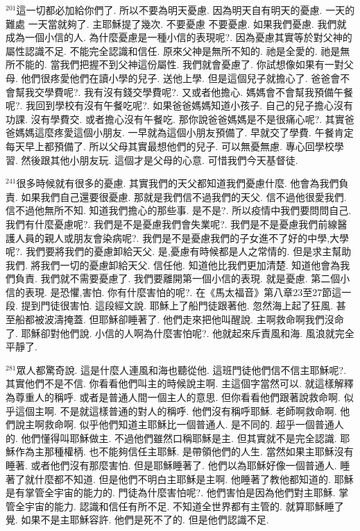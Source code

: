 \documentclass{book}
\begin{document}
$^{201}$這一切都必加給你們了.
所以不要為明天憂慮.
因為明天自有明天的憂慮.
一天的難處 一天當就夠了.
主耶穌提了幾次.
不要憂慮 不要憂慮.
如果我們憂慮.
我們就成為一個小信的人.
為什麼憂慮是一種小信的表現呢?.
因為憂慮其實等於對父神的屬性認識不足.
不能完全認識和信任.
原來父神是無所不知的.
祂是全愛的.
祂是無所不能的.
當我們把握不到父神這份屬性.
我們就會憂慮了.
你試想像如果有一對父母.
他們很疼愛他們在讀小學的兒子.
送他上學.
但是這個兒子就擔心了.
爸爸會不會幫我交學費呢?.
我有沒有錢交學費呢?.
又或者他擔心.
媽媽會不會幫我預備午餐呢?.
我回到學校有沒有午餐吃呢?.
如果爸爸媽媽知道小孩子.
自己的兒子擔心沒有功課.
沒有學費交.
或者擔心沒有午餐吃.
那你說爸爸媽媽是不是很痛心呢?.
其實爸爸媽媽這麼疼愛這個小朋友.
一早就為這個小朋友預備了.
早就交了學費.
午餐肯定每天早上都預備了.
所以父母其實最想他們的兒子.
可以無憂無慮.
專心回學校學習.
然後跟其他小朋友玩.
這個才是父母的心意.
可惜我們今天基督徒.

$^{241}$很多時候就有很多的憂慮.
其實我們的天父都知道我們憂慮什麼.
他會為我們負責.
如果我們自己還要很憂慮.
那就是我們信不過我們的天父.
信不過他很愛我們.
信不過他無所不知.
知道我們擔心的那些事.
是不是?.
所以疫情中我們要問問自己.
我們有什麼憂慮呢?.
我們是不是憂慮我們會失業呢?.
我們是不是憂慮我們前線醫護人員的親人或朋友會染病呢?.
我們是不是憂慮我們的子女進不了好的中學,大學呢?.
我們要將我們的憂慮卸給天父.
是,憂慮有時候都是人之常情的.
但是求主幫助我們.
將我們一切的憂慮卸給天父.
信任他.
知道他比我們更加清楚.
知道他會為我們負責.
我們就不需要憂慮了.
我們要離開第一個小信的表現.
就是憂慮.
第二個小信的表現.
是恐懼,害怕.
你有什麼害怕的呢?.
在《馬太福音》第八章23至27節這一段.
提到門徒很害怕.
這段經文說.
耶穌上了船門徒跟著他.
忽然海上起了狂風.
甚至船都被波濤掩蓋.
但耶穌卻睡著了.
他們走來把他叫醒說.
主啊救命啊我們沒命了.
耶穌卻對他們說.
小信的人啊為什麼害怕呢?.
他就起來斥責風和海.
風浪就完全平靜了.

$^{281}$眾人都驚奇說.
這是什麼人連風和海也聽從他.
這班門徒他們信不信主耶穌呢?.
其實他們不是不信.
你看看他們叫主的時候說主啊.
主這個字當然可以.
就這樣解釋為尊重人的稱呼.
或者是普通人間一個主人的意思.
但你看看他們跟著說救命啊.
似乎這個主啊.
不是就這樣普通的對人的稱呼.
他們沒有稱呼耶穌.
老師啊救命啊.
他們說主啊救命啊.
似乎他們知道主耶穌比一個普通人.
是不同的.
超乎一個普通人的.
他們懂得叫耶穌做主.
不過他們雖然口稱耶穌是主.
但其實就不是完全認識.
耶穌作為主那種權柄.
也不能夠信任主耶穌.
是帶領他們的人生.
當然如果主耶穌沒有睡著.
或者他們沒有那麼害怕.
但是耶穌睡著了.
他們以為耶穌好像一個普通人.
睡著了就什麼都不知道.
但是他們不明白主耶穌是主啊.
他睡著了教他都知道的.
耶穌是有掌管全宇宙的能力的.
門徒為什麼害怕呢?.
他們害怕是因為他們對主耶穌.
掌管全宇宙的能力.
認識和信任有所不足.
不知道全世界都有主管的.
就算耶穌睡了覺.
如果不是主耶穌容許.
他們是死不了的.
但是他們認識不足.
\end{document}
